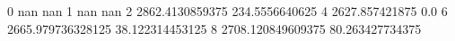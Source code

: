 0 nan nan
1 nan nan
2 2862.4130859375 234.5556640625
4 2627.857421875 0.0
6 2665.979736328125 38.122314453125
8 2708.120849609375 80.263427734375
